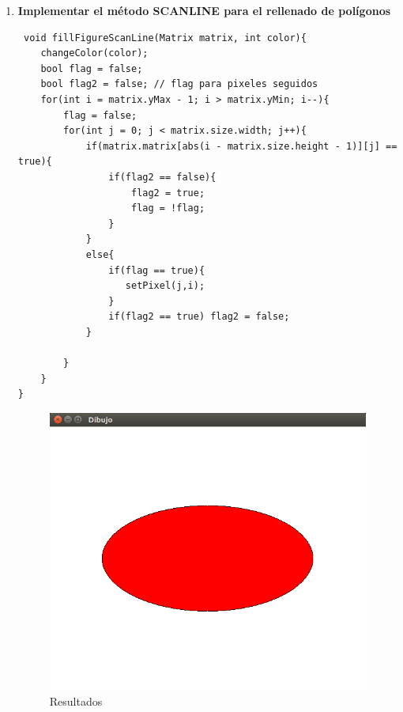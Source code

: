 \documentclass[a4paper,12pt]{article}
\begin{document}
\begin{enumerate}
 \item \textbf{Implementar el método SCANLINE para el rellenado de polígonos}
 
 \begin{lstlisting}
 void fillFigureScanLine(Matrix matrix, int color){
    changeColor(color);
    bool flag = false;
    bool flag2 = false; // flag para pixeles seguidos
    for(int i = matrix.yMax - 1; i > matrix.yMin; i--){
        flag = false;
        for(int j = 0; j < matrix.size.width; j++){
            if(matrix.matrix[abs(i - matrix.size.height - 1)][j] == true){
                if(flag2 == false){
                    flag2 = true;
                    flag = !flag;
                }
            }
            else{
                if(flag == true){
                   setPixel(j,i);
                }
                if(flag2 == true) flag2 = false;
            }
            
        }
    }  
}
 \end{lstlisting}
 
 \begin{figure}[H]
  \centering
  \includegraphics[scale = 0.5]{2.png}
  \caption{Resultados}
  
 \end{figure}


  

 
\end{enumerate}
\end{document}
